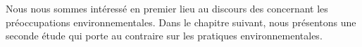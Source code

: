     Nous nous sommes intéressé en premier lieu au discours des \oess concernant les préoccupations environnementales. Dans le chapitre suivant, nous présentons une seconde étude qui porte au contraire sur les pratiques environnementales.






